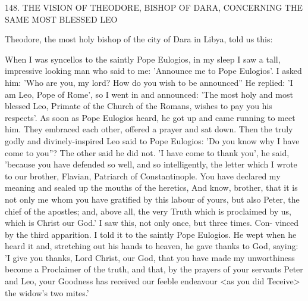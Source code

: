 148.
THE VISION OF THEODORE,
BISHOP OF DARA,
CONCERNING THE SAME MOST BLESSED LEO

Theodore, the most holy bishop of the city of Dara in Libya, told
us this:

When I was syncellos to the saintly Pope Eulogios, in my sleep I
saw a tall, impressive looking man who said to me: 'Announce me
to Pope Eulogios'.
I asked him: 'Who are you, my lord? How do
you wish to be announced” He replied: 'I am Leo, Pope of Rome',
so I went in and announced: 'The most holy and most blessed Leo,
Primate of the Church of the Romans, wishes to pay you his
respects'.
As soon as Pope Eulogios heard, he got up and came
running to meet him.
They embraced each other, offered a prayer
and sat down.
Then the truly godly and divinely-inspired Leo said
to Pope Eulogios: 'Do you know why I have come to you”? The
other said he did not.
'I have come to thank you', he said, 'because
you have defended so well, and so intelligently, the letter which I
wrote to our brother, Flavian, Patriarch of Constantinople.
You
have declared my meaning and sealed up the mouths of the heretics,
And know, brother, that it is not only me whom you have gratified
by this labour of yours, but also Peter, the chief of the apostles;
and, above all, the very Truth which is proclaimed by us, which is
Christ our God.' I saw this, not only once, but three times.
Con-
vinced by the third apparition.
I told it to the saintly Pope Eulogios.
He wept when he heard it and, stretching out his hands to heaven,
he gave thanks to God, saying: 'I give you thanks, Lord Christ, our
God, that you have made my unworthiness become a Proclaimer of
the truth, and that, by the prayers of your servants Peter and Leo,
your Goodness has received our feeble endeavour <as you did
Teceive> the widow's two mites.'


